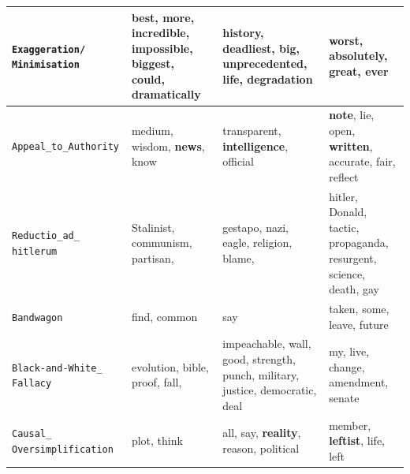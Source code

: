 \begin{table}[!htbp]
{\begin{tabular}{p{}|p{}|p{}|p{}}
            \hline
            \texttt{Exaggeration/ Minimisation}                      & best, more, incredible, impossible, biggest, could, dramatically              & history, deadliest, big, unprecedented, life, degradation                                                                               & worst, absolutely, great, ever                                                       \\
            \hline
            \texttt{Appeal\_to\_Authority}                           & medium, wisdom, \textbf{news}, know                                           & transparent, \textbf{intelligence}, official                                                                                            & \textbf{note}, lie, open, \textbf{written}, accurate, fair, reflect                  \\
            \hline
            \texttt{Reductio\_ad\_ hitlerum}                         & Stalinist, communism, partisan,                                               & gestapo, nazi, eagle, religion, blame,                                                                                                  & hitler, Donald, tactic, propaganda, resurgent, science, death, gay                   \\
            \hline
            \texttt{Bandwagon}                                       & find, common                                                                  & say                                                                                                                                     & taken, some, leave, future                                                           \\
            \hline
            \texttt{Black-and-White\_ Fallacy}                       & evolution, bible, proof, fall,                                                & impeachable, wall, good, strength, punch, military, justice, democratic, deal                                                           & my, live, change, amendment, senate                                                  \\
            \hline
            \texttt{Causal\_ Oversimplification}                     & plot, think                                                                   & all, say, \textbf{reality}, reason, political                                                                                           & member, \textbf{leftist}, life, left                                                 \\

\end{tabular}}
\end{table}
